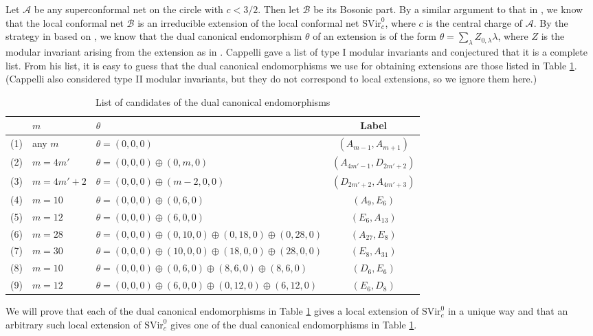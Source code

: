 \documentclass[11pt]{article}
\def\th{\theta}
\def\A{{\cal A}}
\def\B{{\cal B}}
\def\SVir{{\mathrm {SVir}}}
\def\la{\lambda}
\def\A{{\mathcal A}}
\def\B{{\mathcal B}}
\begin{document}
Let $\A$ be any superconformal net on the circle with $c<3/2$.
Then let $\B$ be its Bosonic part.  By a similar argument to that
in \cite[Proposition 3.5]{KL1}, we know that the local conformal
net $\B$ is an irreducible extension of the local conformal
net $\SVir^0_c$, where $c$ is the central charge of $\A$.
By the strategy in \cite{KL1} based on \cite{BEK1},
we know that the dual canonical endomorphism $\th$ of an extension
is of the form $\th=\sum_{\la}Z_{0,\la}\la$, where $Z$ is the
modular invariant arising from the extension as in \cite{BEK1}.
Cappelli \cite{Ca} gave a list of type I modular invariants and
conjectured that it is a complete list.  From his list,
it is easy to guess that the dual canonical endomorphisms
we use for obtaining extensions are those listed
in Table \ref{dual-can}.
(Cappelli also considered type II modular invariants, but they
do not correspond to local extensions, so we ignore them here.)
%
\begin{table}[htbp]
\begin{center}
\begin{tabular}{|c|l|l|c|}\hline
& $m$ & $\th$ & Label
\\ \hline
(1) & any $m$ & $\th=(0,0,0)$ & $(A_{m-1},A_{m+1})$ \\ \hline
(2) & $m=4m'$ & $\th=(0,0,0)\oplus(0,m,0)$ & $(A_{4m'-1}, D_{2m'+2})$ 
\\ \hline
(3) & $m=4m'+2$ & $\th=(0,0,0)\oplus(m-2,0,0)$ & $(D_{2m'+2}, A_{4m'+3})$ 
\\ \hline
(4) & $m=10$ & $\th=(0,0,0)\oplus(0,6,0)$ & $(A_9, E_6)$ \\ \hline
(5) & $m=12$ & $\th=(0,0,0)\oplus(6,0,0)$ & $(E_6, A_{13})$ \\ \hline
(6) & $m=28$ & $\th=(0,0,0)\oplus(0,10,0)\oplus(0,18,0)\oplus(0,28,0)$
& $(A_{27},E_8)$ \\ \hline
(7) & $m=30$ & $\th=(0,0,0)\oplus(10,0,0)\oplus(18,0,0)\oplus(28,0,0)$
& $(E_8, A_{31})$ \\ \hline
(8) & $m=10$ & $\th=(0,0,0)\oplus(0,6,0)\oplus(8,6,0)\oplus(8,6,0)$
& $(D_6, E_6)$ \\ \hline
(9) & $m=12$ & $\th=(0,0,0)\oplus(6,0,0)\oplus(0,12,0)\oplus(6,12,0)$
& $(E_6, D_8)$ \\ \hline
\end{tabular}
\caption{List of candidates of the dual canonical endomorphisms}
\label{dual-can}
\end{center}
\end{table}
%
We will prove that each of the dual canonical endomorphisms 
in Table \ref{dual-can} gives a local extension of $\SVir^0_c$ 
in a unique way and that an arbitrary such local extension of
$\SVir^0_c$ gives one of the dual canonical endomorphisms 
in Table \ref{dual-can}.
\end{document}

